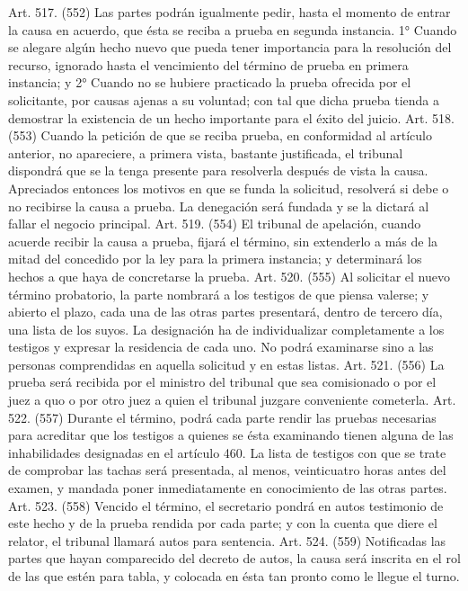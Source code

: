     Art. 517. (552) Las partes podrán igualmente pedir, hasta el momento de entrar la causa en acuerdo, que ésta se reciba a prueba en segunda instancia.
    1° Cuando se alegare algún hecho nuevo que pueda tener importancia para la resolución del recurso, ignorado hasta el vencimiento del término de prueba en primera instancia; y
    2° Cuando no se hubiere practicado la prueba ofrecida por el solicitante, por causas ajenas a su voluntad; con tal que dicha prueba tienda a demostrar la existencia de un hecho importante para el éxito del juicio.
    Art. 518. (553) Cuando la petición de que se reciba prueba, en conformidad al artículo anterior, no apareciere, a primera vista, bastante justificada, el tribunal dispondrá que se la tenga presente para resolverla después de vista la causa. Apreciados entonces los motivos en que se funda la solicitud, resolverá si debe o no recibirse la causa a prueba.
    La denegación será fundada y se la dictará al fallar el negocio principal.
    Art. 519. (554) El tribunal de apelación, cuando acuerde recibir la causa a prueba, fijará el término, sin extenderlo a más de la mitad del concedido por la ley para la primera instancia; y determinará los hechos a que haya de concretarse la prueba.
    Art. 520. (555) Al solicitar el nuevo término probatorio, la parte nombrará a los testigos de que piensa valerse; y abierto el plazo, cada una de las otras partes presentará, dentro de tercero día, una lista de los suyos. La designación ha de individualizar completamente a los testigos y expresar la residencia de cada uno.
    No podrá examinarse sino a las personas comprendidas en aquella solicitud y en estas listas.
    Art. 521. (556) La prueba será recibida por el ministro del tribunal que sea comisionado o por el juez a quo o por otro juez a quien el tribunal juzgare conveniente cometerla.
    Art. 522. (557) Durante el término, podrá cada parte rendir las pruebas necesarias para acreditar que los testigos a quienes se ésta examinando tienen alguna de las inhabilidades designadas en el artículo 460.
    La lista de testigos con que se trate de comprobar las tachas será presentada, al menos, veinticuatro horas antes del examen, y mandada poner inmediatamente en conocimiento de las otras partes.
    Art. 523. (558) Vencido el término, el secretario pondrá en autos testimonio de este hecho y de la prueba rendida por cada parte; y con la cuenta que diere el relator, el tribunal llamará autos para sentencia.
    Art. 524. (559) Notificadas las partes que hayan comparecido del decreto de autos, la causa será inscrita en el rol de las que estén para tabla, y colocada en ésta tan pronto como le llegue el turno.
